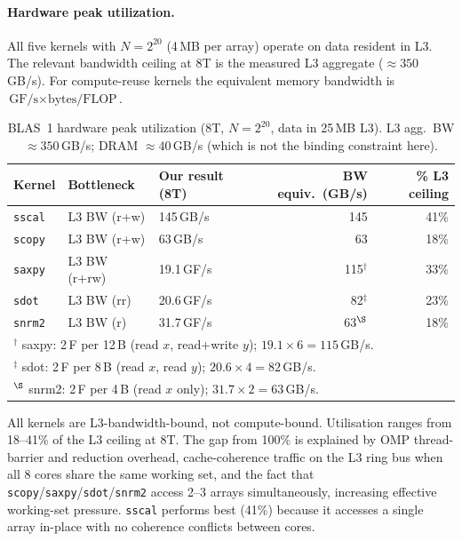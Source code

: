 \documentclass[11pt,a4paper]{article}
\begin{document}
\paragraph{Hardware peak utilization.}
All five kernels with $N = 2^{20}$ (4\,MB per array) operate on data resident in L3. The relevant bandwidth ceiling at 8T is the measured L3 aggregate ($\approx 350$\,GB/s). For compute-reuse kernels the equivalent memory bandwidth is $\text{GF/s} \times \text{bytes/FLOP}$.

\begin{table}[h]
\centering
\caption{BLAS~1 hardware peak utilization (8T, $N=2^{20}$, data in 25\,MB L3).
  L3 agg.\ BW $\approx 350$\,GB/s; DRAM $\approx 40$\,GB/s (which is not the binding constraint here).}
\label{tab:blas1_peak}
\small
\begin{tabular}{lllrr}
\toprule
Kernel & Bottleneck & Our result (8T) & BW equiv.\ (GB/s) & \% L3 ceiling \\
\midrule
\texttt{sscal} & L3 BW (r+w) & 145\,GB/s   & 145 & 41\% \\
\texttt{scopy} & L3 BW (r+w) & 63\,GB/s    &  63 & 18\% \\
\texttt{saxpy} & L3 BW (r+rw)& 19.1\,GF/s  & 115$^\dagger$ & 33\% \\
\texttt{sdot}  & L3 BW (rr)  & 20.6\,GF/s  &  82$^\ddagger$& 23\% \\
\texttt{snrm2} & L3 BW (r)   & 31.7\,GF/s  &  63$^\S$      & 18\% \\
\bottomrule
\multicolumn{5}{l}{$^\dagger$ saxpy: 2\,F per 12\,B (read $x$, read+write $y$); $19.1 \times 6 = 115$\,GB/s.}\\
\multicolumn{5}{l}{$^\ddagger$ sdot: 2\,F per 8\,B (read $x$, read $y$); $20.6 \times 4 = 82$\,GB/s.}\\
\multicolumn{5}{l}{$^\S$ snrm2: 2\,F per 4\,B (read $x$ only); $31.7 \times 2 = 63$\,GB/s.}
\end{tabular}
\end{table}

All kernels are L3-bandwidth-bound, not compute-bound. Utilisation ranges from 18--41\% of the L3 ceiling at 8T. The gap from 100\% is explained by OMP thread-barrier and reduction overhead, cache-coherence traffic on the L3 ring bus when all 8 cores share the same working set, and the fact that \texttt{scopy}/\texttt{saxpy}/\texttt{sdot}/\texttt{snrm2} access 2--3 arrays simultaneously, increasing effective working-set pressure. \texttt{sscal} performs best (41\%) because it accesses a single array in-place with no coherence conflicts between cores.
\end{document}
